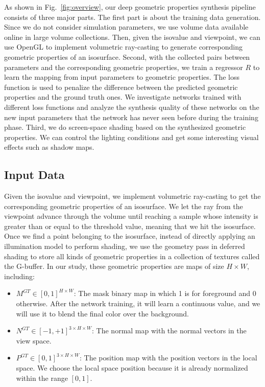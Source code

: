 \documentclass[journal]{vgtc}                %
\begin{document}
As shown in Fig.~\ref{fig:overview}, our deep geometric properties synthesis pipeline consists of three major parts. The first part is about the training data generation. Since we do not consider simulation parameters, we use volume data available online in large volume collections. Then, given the isovalue and viewpoint, we can use OpenGL \cite{woo1999opengl} to implement volumetric ray-casting to generate corresponding geometric properties of an isosurface. Second, with the collected pairs between parameters and the corresponding geometric properties, we train a regressor $R$ to learn the mapping from input parameters to geometric properties. The loss function is used to penalize the difference between the predicted geometric properties and the ground truth ones. We investigate networks trained with different loss functions and analyze the synthesis quality of these networks on the new input parameters that the network has never seen before during the training phase. Third, we do screen-space shading based on the synthesized geometric properties. We can control the lighting conditions and get some interesting visual effects such as shadow maps.

\subsection{Input Data}
Given the isovalue and viewpoint, we implement volumetric ray-casting to get the corresponding geometric properties of an isosurface. We let the ray from the viewpoint advance through the volume until reaching a sample whose intensity is greater than or equal to the threshold value, meaning that we hit the isosurface. Once we find a point belonging to the isosurface, instead of directly applying an illumination model to perform shading, we use the geometry pass in deferred shading \cite{deering1988triangle} to store all kinds of geometric properties in a collection of textures called the G-buffer. In our study, these geometric properties are maps of size $ H \times W $, including:

\begin{itemize}
\item $M^{GT} \in [0, 1] ^ {H \times W}$: The mask binary map in which 1 is for foreground and 0 otherwise. After the network training, it will learn a continuous value, and we will use it to blend the final color over the background.  

\item $N^{GT} \in [-1, +1] ^ {3 \times H \times W}$: The normal map with the normal vectors in the view space.

\item $P^{GT} \in [0, 1] ^ {3 \times H \times W}$: The position map with the position vectors in the local space. We choose the local space position because it is already normalized within the range $[0, 1]$.

\end{itemize}
\end{document}
